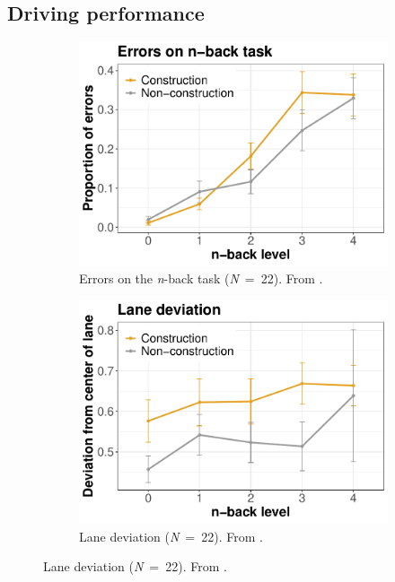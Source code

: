 \subsection{Driving performance}
\begin{figure}
  \centering
  \begin{subfigure}[b]{0.3\textwidth}
    \centering
    \includegraphics[width=\textwidth]{images/error_rates.pdf}
    \caption{Errors on the \textit{n}-back task (\textit{N}\ =\ 22). From \citet{DeMooij2021}.}
    \label{fig:errors}
  \end{subfigure}
  \hfill
  \begin{subfigure}[b]{0.3\textwidth}
    \centering
    \includegraphics[width=\textwidth]{images/lane_deviation.pdf}
    \caption{Lane deviation (\textit{N}\ =\ 22). From \citet{Kelapanda2021}.}

\end{subfigure}
\end{figure}
